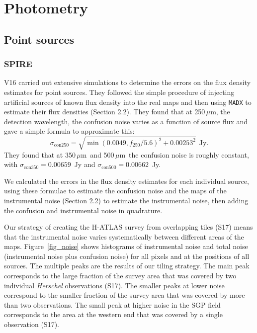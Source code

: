 \documentclass[a4paper,fleqn,usenatbib, twocolumn]{aastex61}
\def\mic{\,$\mu $m}
\begin{document}
\section{Photometry}

\subsection{Point sources}

\subsubsection{SPIRE}

V16 carried out extensive simulations to determine the
errors on the flux density estimates for point sources.
They followed the simple procedure of injecting artificial
sources of known flux density into the real maps and then
using {\tt MADX} to estimate their flux densities
(Section 2.2).  
They found that at 250\mic, the detection
wavelength, the confusion noise varies as a function
of source flux and gave a simple formula to approximate this:
\smallskip
\begin{equation}
\sigma_{\mathrm{con}250} = \sqrt{\min(0.0049,f_{250}/5.6)^2 +
  0.00253^2} \ \ \mathrm{Jy}.
\end{equation}
\smallskip
\noindent They found that 
at 350\mic\ and 500\mic\ the confusion noise 
is roughly constant, with $\sigma_{\mathrm{con}350} = 0.00659$~Jy and
$\sigma_{\mathrm{con}500} = 0.00662$~Jy.

We calculated the errors in the flux density estimates for each
individual source, using these formulae to estimate the confusion
noise and the maps of the instrumental noise (Section 2.2) to estimate
the instrumental noise, then adding the confusion and instrumental
noise in quadrature.


Our strategy of creating the H-ATLAS survey from overlapping tiles
(S17) means that the instrumental noise varies systematically between
different areas of the maps.  Figure~\ref{fig_noise} shows histograms
of instrumental noise and total noise (instrumental noise plus
confusion noise) for all pixels and at the positions of all sources.
The multiple peaks are the results of our tiling strategy. The main
peak corresponds to the large fraction of the survey area that was
covered by two individual {\it Herschel} observations (S17). The
smaller peaks at lower noise correspond to the smaller fraction of the
survey area that was covered by more than two observations. The small
peak at higher noise in the SGP field corresponds to the area at the
western end that was covered by a single observation (S17).
\end{document}
